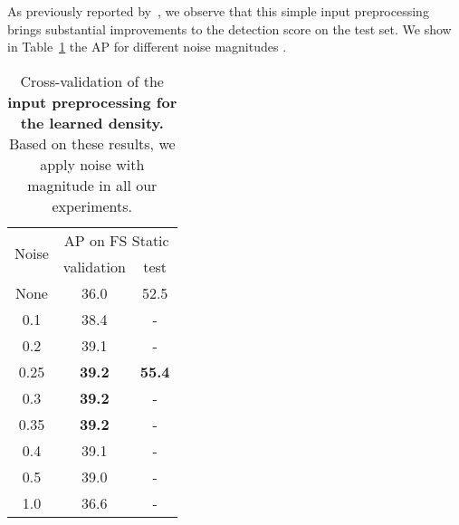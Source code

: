  As previously reported by~\cite{Liang2017-mj,Lee2018-si}, we observe that this simple input preprocessing brings substantial improvements to the detection score on the test set. We show in Table~\ref{tab:learned:noise} the AP for different noise magnitudes .

\begin{table}[htb]
    \centering
    \footnotesize
    \begin{tabular}{ccc}
      \toprule
      \multirow{2}{*}{Noise } & \multicolumn{2}{c}{AP on FS Static} \\
      & validation & test \\
      \midrule
      None & 36.0 & 52.5 \\
      0.1 & 38.4 & - \\
      0.2 & 39.1 & - \\
      0.25 & \textbf{39.2} & \textbf{55.4} \\
      0.3 & \textbf{39.2} & - \\
      0.35 & \textbf{39.2} & - \\
      0.4 & 39.1 & - \\
      0.5 & 39.0 & - \\
      1.0 & 36.6 & - \\
      \bottomrule
    \end{tabular}
    \vspace{3mm}
    \caption{Cross-validation of the \textbf{input preprocessing for the learned density.} Based on these results, we apply noise with magnitude  in all our experiments.}
    \label{tab:learned:noise}
\end{table}